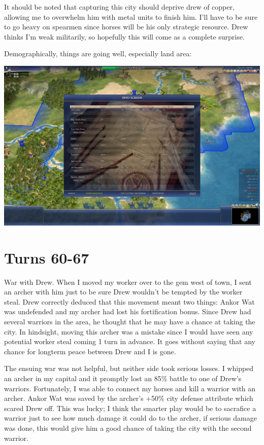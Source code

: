 \documentclass[10pt]{article}
\begin{document}
It should be noted that capturing this city should deprive drew of
copper, allowing me to overwhelm him with metal units to finish
him. I'll have to be sure to go heavy on spearmen since horses will be
his only strategic resource. Drew thinks I'm weak militarily, so
hopefully this will come as a complete surprise.

Demographically, things are going well, especially land area:

\includegraphics[width=1.0\textwidth]{turn58-2}

\section*{Turns 60-67}

War with Drew. When I moved my worker over to the gem west of town, I
sent an archer with him just to be sure Drew wouldn't be tempted by
the worker steal. Drew correctly deduced that this movement meant two
things: Ankor Wat was undefended and my archer had lost his
fortification bonus. Since Drew had several warriors in the area, he
thought that he may have a chance at taking the city. In hindsight,
moving this archer was a mistake since I would have seen any potential
worker steal coming 1 turn in advance. It goes without saying that any
chance for longterm peace between Drew and I is gone.

The ensuing war was not helpful, but neither side took serious
losses. I whipped an archer in my capital and it promptly lost an 85\%
battle to one of Drew's warriors. Fortunately, I was able to connect
my horses and kill a warrior with an archer. Ankor Wat was saved by
the archer's +50\% city defense attribute which scared Drew off. This
was lucky; I think the smarter play would be to sacrafice a warrior
just to see how much damage it could do to the archer, if serious
damage was done, this would give him a good chance of taking the city
with the second warrior.
\end{document}
